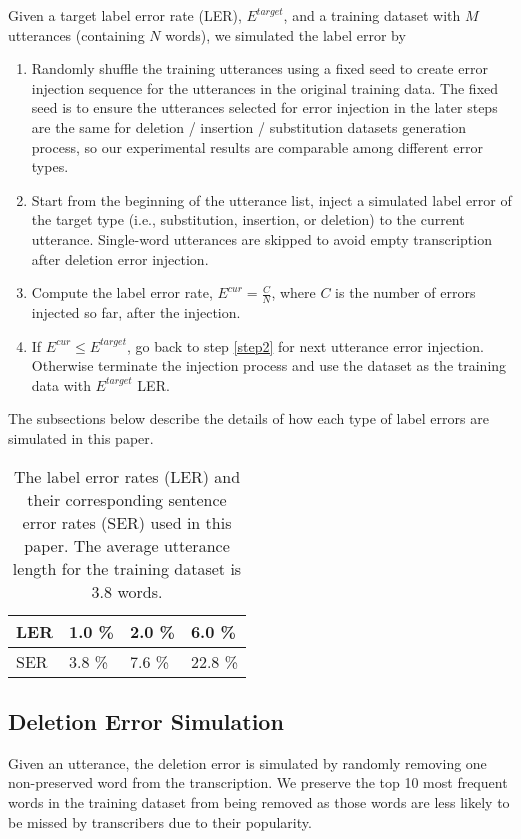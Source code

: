 \documentclass{article}
\begin{document}

Given a target label error rate (LER), $E^{target}$, and a training dataset with $M$ utterances (containing $N$ words), we simulated the label error by
\begin{enumerate}
\item Randomly shuffle the training utterances using a fixed seed to create error injection sequence for the utterances in the original training data. The fixed seed is to ensure the utterances selected for error injection in the later steps are the same for deletion / insertion / substitution datasets generation process, so our experimental results are comparable among different error types.
\item \label{step2} Start from the beginning of the utterance list, inject a simulated label error of the target type (i.e., substitution, insertion, or deletion) to the current utterance. Single-word utterances are skipped to avoid empty transcription after deletion error injection. 
\item \label{step3} Compute the label error rate, $E^{cur}=\frac{C}{N}$, where $C$ is the number of errors injected so far, after the injection.
\item \label{step4} If $E^{cur} \le E^{target}$, go back to step \ref{step2} for next utterance error injection. Otherwise terminate the injection process and use the dataset as the training data with $E^{target}$ LER. 
\end{enumerate}
The subsections below describe the details of how each type of label errors are simulated in this paper.

\begin{table}[h]
	\caption{The label error rates (LER) and their corresponding sentence error rates (SER) used in this paper. The average utterance length for the training dataset is 3.8 words.}
	\label{tab:ler_ser}
  	\centering
	\begin{tabular}{|l|l|l|l|}
	\hline
	\rowcolor[HTML]{EFEFEF} 
	\textbf{LER} & \textbf{1.0 \%} & \textbf{2.0 \%} & \textbf{6.0 \%} \\ \hline
	SER          & 3.8 \%          & 7.6 \%          & 22.8 \%         \\ \hline
	\end{tabular}
\end{table}
\subsection{Deletion Error Simulation}\label{del_sim}
Given an utterance, the deletion error is simulated by randomly removing one non-preserved word from the transcription. We preserve the top 10 most frequent words in the training dataset from being removed as those words are less likely to be missed by transcribers due to their popularity.
\end{document}

